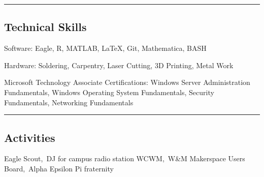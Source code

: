 \documentclass[10pt,letterpaper]{article}
\newenvironment{indentsection}[1]%
{\begin{list}{}%
	{\setlength{\leftmargin}{#1}}%
	\item[]%
}
{\end{list}}
\begin{document}
\hrule
\vspace{-0.4em}
\subsection*{Technical Skills}

\begin{description*}
	\item[Software:]
	Eagle, R, MATLAB, \LaTeX, Git, Mathematica, BASH
	\item[Hardware:]
	Soldering, Carpentry, Laser Cutting, 3D Printing, Metal Work
	\item[Microsoft Technology Associate Certifications:]
	\hfill \break
	Windows Server Administration Fundamentals,
	Windows Operating System Fundamentals,
	Security Fundamentals,
	Networking Fundamentals
\end{description*}

\hrule
\vspace{-0.4em}
\subsection*{Activities}
\indent Eagle Scout,\, DJ for campus radio station WCWM,\, W\&M Makerspace Users Board,\, Alpha Epsilon Pi fraternity
\end{document}
